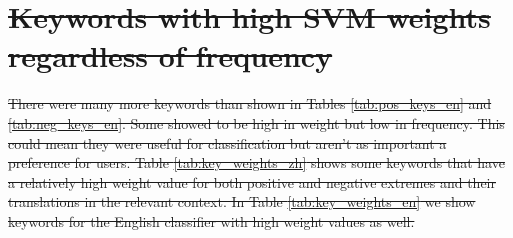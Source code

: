 \documentclass[smallextended,natbib]{svjour3}       %
\providecommand{\DIFdel}[1]{{\protect\color{red}\sout{#1}}}                      %
\begin{document}
\section[]{\DIFdel{Keywords with high SVM weights regardless of frequency}}%
\addtocounter{section}{-1}%

\DIFdel{There were many more keywords than shown in Tables \ref{tab:pos_keys_en} and \ref{tab:neg_keys_en}. Some showed to be high in weight but low in frequency. This could mean they were useful for classification but aren't as important a preference for users. Table \ref{tab:key_weights_zh} shows some keywords that have a relatively high weight value for both positive and negative extremes and their translations in the relevant context. In Table \ref{tab:key_weights_en} we show keywords for the English classifier with high weight values as well.
}%
\end{document}
